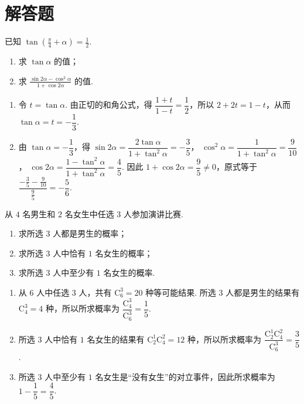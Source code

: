 \section{解答题}
\begin{problem}
已知 \(\tan \left(\frac{\pi}{4} + \alpha\right) = \frac{1}{2}\).

\begin{enumerate}
\item 求 \(\tan\alpha\) 的值；
\item 求 \(\frac{\sin 2\alpha - \cos^{2}\alpha}{1 + \cos 2\alpha}\) 的值.
\end{enumerate}
\end{problem}

\begin{solution}
\begin{enumerate}
\item 令 \(t=\tan\alpha\). 由正切的和角公式，得
\(\dfrac{1+t}{1-t}=\dfrac12\)，所以 \(2+2t=1-t\)，从而 \(\tan\alpha=t=-\dfrac13\).
\item 由 \(\tan\alpha=-\dfrac13\)，得
\(\sin2\alpha=\dfrac{2\tan\alpha}{1+\tan^2\alpha}=-\dfrac35\)，
\(\cos^2\alpha=\dfrac{1}{1+\tan^2\alpha}=\dfrac9{10}\)，
\(\cos2\alpha=\dfrac{1-\tan^2\alpha}{1+\tan^2\alpha}=\dfrac45\). 因此
\(1+\cos2\alpha=\dfrac95\ne0\)，原式等于
\(\dfrac{-\frac35-\frac9{10}}{\frac95}=-\dfrac56\).
\end{enumerate}
\end{solution}

\begin{problem}
从 \(4\) 名男生和 \(2\) 名女生中任选 \(3\) 人参加演讲比赛.

\begin{enumerate}
\item 求所选 \(3\) 人都是男生的概率；
\item 求所选 \(3\) 人中恰有 \(1\) 名女生的概率；
\item 求所选 \(3\) 人中至少有 \(1\) 名女生的概率.
\end{enumerate}
\end{problem}

\begin{solution}
\begin{enumerate}
\item 从 \(6\) 人中任选 \(3\) 人，共有 \(\mathrm C_6^3=20\) 种等可能结果. 所选 \(3\) 人都是男生的结果有 \(\mathrm C_4^3=4\) 种，所以所求概率为
\(\dfrac{\mathrm C_4^3}{\mathrm C_6^3}=\dfrac15\).
\item 所选 \(3\) 人中恰有 \(1\) 名女生的结果有 \(\mathrm C_2^1\mathrm C_4^2=12\) 种，所以所求概率为
\(\dfrac{\mathrm C_2^1\mathrm C_4^2}{\mathrm C_6^3}=\dfrac35\).
\item 所选 \(3\) 人中至少有 \(1\) 名女生是“没有女生”的对立事件，因此所求概率为
\(1-\dfrac15=\dfrac45\).
\end{enumerate}
\end{solution}

